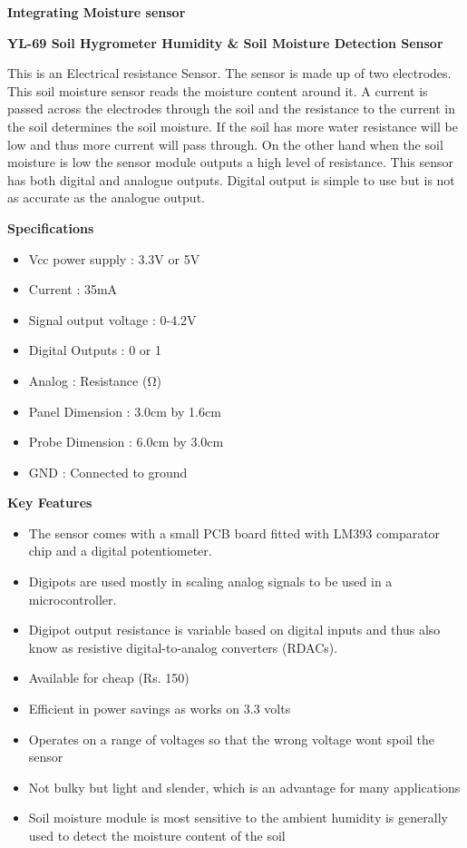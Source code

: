 \documentclass[16pt]{article}
\begin{document}
{\Large{\textbf{Integrating Moisture
sensor}}}

\textbf{YL-69 Soil Hygrometer Humidity \& Soil Moisture Detection Sensor}


This is an Electrical resistance Sensor. The sensor is made up of two
electrodes. This soil moisture sensor reads the moisture content around
it. A current is passed across the electrodes through the soil and the
resistance to the current in the soil determines the soil moisture. If
the soil has more water resistance will be low and thus more current
will pass through. On the other hand when the soil moisture is low the
sensor module outputs a high level of resistance. This sensor has both
digital and analogue outputs. Digital output is simple to use but is not
as accurate as the analogue output.

{\Large{\textbf{Specifications}}}

\begin{itemize}

\item
  Vcc power supply : 3.3V or 5V
\item
  Current : 35mA
\item
  Signal output voltage : 0-4.2V
\item
  Digital Outputs : 0 or 1
\item
  Analog : Resistance (Ω)
\item
  Panel Dimension : 3.0cm by 1.6cm
\item
  Probe Dimension : 6.0cm by 3.0cm
\item
  GND : Connected to ground
\end{itemize}

{\Large{\textbf{Key Features}}}

\begin{itemize}

\item
  The sensor comes with a small PCB board fitted with LM393 comparator
  chip and a digital potentiometer.
\item
  Digipots are used mostly in scaling analog signals to be used in a
  microcontroller.
\item
  Digipot output resistance is variable based on digital inputs and thus
  also know as resistive digital-to-analog converters (RDACs).
\item
  Available for cheap (Rs. 150)
\item
  Efficient in power savings as works on 3.3 volts
\item
  Operates on a range of voltages so that the wrong voltage wont spoil
  the sensor
\item
  Not bulky but light and slender, which is an advantage for many
  applications
\item
  Soil moisture module is most sensitive to the ambient humidity is
  generally used to detect the moisture content of the soil
\end{itemize}
\end{document}
